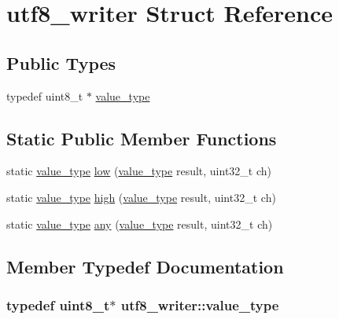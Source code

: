 \hypertarget{structutf8__writer}{
\section{utf8\_\-writer Struct Reference}
\label{structutf8__writer}
}
\subsection*{Public Types}
\begin{DoxyCompactItemize}
\item 
typedef uint8\_\-t $\ast$ \hyperlink{structutf8__writer_af25ec3c651f9a4a3f193573a4e95002b}{value\_\-type}
\end{DoxyCompactItemize}
\subsection*{Static Public Member Functions}
\begin{DoxyCompactItemize}
\item 
static \hyperlink{structutf8__writer_af25ec3c651f9a4a3f193573a4e95002b}{value\_\-type} \hyperlink{structutf8__writer_ac4ec52da6f37225ba4fde259bff2f86c}{low} (\hyperlink{structutf8__writer_af25ec3c651f9a4a3f193573a4e95002b}{value\_\-type} result, uint32\_\-t ch)
\item 
static \hyperlink{structutf8__writer_af25ec3c651f9a4a3f193573a4e95002b}{value\_\-type} \hyperlink{structutf8__writer_ac03dfaf797d599afdf0be7def86ff9b9}{high} (\hyperlink{structutf8__writer_af25ec3c651f9a4a3f193573a4e95002b}{value\_\-type} result, uint32\_\-t ch)
\item 
static \hyperlink{structutf8__writer_af25ec3c651f9a4a3f193573a4e95002b}{value\_\-type} \hyperlink{structutf8__writer_a288e9c5f3720b95ae6b77330ad38dd56}{any} (\hyperlink{structutf8__writer_af25ec3c651f9a4a3f193573a4e95002b}{value\_\-type} result, uint32\_\-t ch)
\end{DoxyCompactItemize}


\subsection{Member Typedef Documentation}
\hypertarget{structutf8__writer_af25ec3c651f9a4a3f193573a4e95002b}{
\subsubsection[{value\_\-type}]{\setlength{\rightskip}{0pt plus 5cm}typedef uint8\_\-t$\ast$ {\bf utf8\_\-writer::value\_\-type}}}
\label{structutf8__writer_af25ec3c651f9a4a3f193573a4e95002b}


